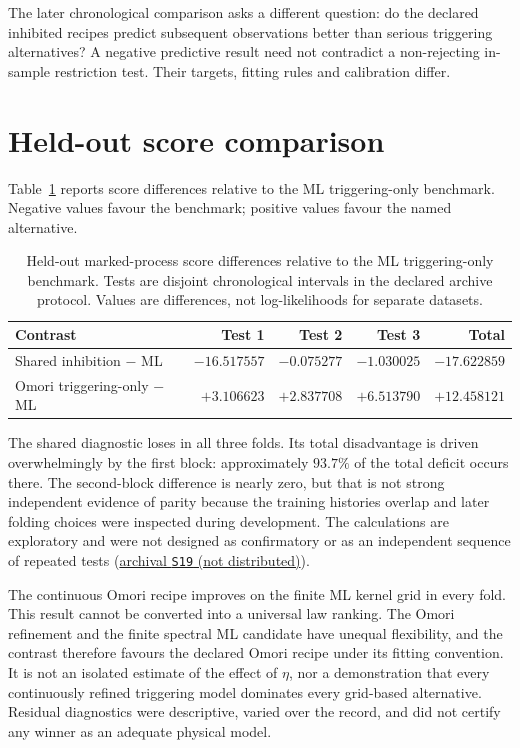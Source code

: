 The later chronological comparison asks a different question: do the declared inhibited recipes predict subsequent observations better than serious triggering alternatives? A negative predictive result need not contradict a non-rejecting in-sample restriction test. Their targets, fitting rules and calibration differ.

\section{Held-out score comparison}

Table~\ref{tab:observed-scores} reports score differences relative to the ML triggering-only benchmark. Negative values favour the benchmark; positive values favour the named alternative.

\begin{table}[!ht]
\centering
\caption{Held-out marked-process score differences relative to the ML triggering-only benchmark. Tests are disjoint chronological intervals in the declared archive protocol. Values are differences, not log-likelihoods for separate datasets.}
\label{tab:observed-scores}
\small
\setlength{\tabcolsep}{4pt}
\begin{tabular}{lrrrr}
\toprule
Contrast & Test 1 & Test 2 & Test 3 & Total \\
\midrule
Shared inhibition \(-\) ML & \(-16.517557\) & \(-0.075277\) & \(-1.030025\) & \(-17.622859\) \\
Omori triggering-only \(-\) ML & \(+3.106623\) & \(+2.837708\) & \(+6.513790\) & \(+12.458121\) \\
\bottomrule
\end{tabular}
\end{table}

The shared diagnostic loses in all three folds. Its total disadvantage is driven overwhelmingly by the first block: approximately \(93.7\%\) of the total deficit occurs there. The second-block difference is nearly zero, but that is not strong independent evidence of parity because the training histories overlap and later folding choices were inspected during development. The calculations are exploratory and were not designed as confirmatory or as an independent sequence of repeated tests (\hyperlink{S19}{archival \texttt{S19} (not distributed)}).

The continuous Omori recipe improves on the finite ML kernel grid in every fold. This result cannot be converted into a universal law ranking. The Omori refinement and the finite spectral ML candidate have unequal flexibility, and the contrast therefore favours the declared Omori recipe under its fitting convention. It is not an isolated estimate of the effect of \(\eta\), nor a demonstration that every continuously refined triggering model dominates every grid-based alternative. Residual diagnostics were descriptive, varied over the record, and did not certify any winner as an adequate physical model.


